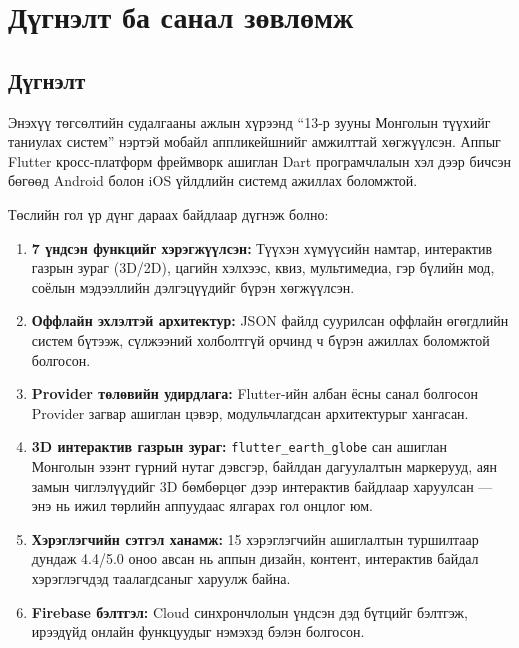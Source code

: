 \newpage
\pagestyle{plain}
\chapter{Дүгнэлт ба санал зөвлөмж}

\section{Дүгнэлт}

Энэхүү төгсөлтийн судалгааны ажлын хүрээнд ``13-р зууны Монголын түүхийг таниулах систем'' нэртэй мобайл аппликейшнийг амжилттай хөгжүүлсэн. Аппыг Flutter кросс-платформ фреймворк ашиглан Dart програмчлалын хэл дээр бичсэн бөгөөд Android болон iOS үйлдлийн системд ажиллах боломжтой.

Төслийн гол үр дүнг дараах байдлаар дүгнэж болно:

\begin{enumerate}
	\item \textbf{7 үндсэн функцийг хэрэгжүүлсэн:} Түүхэн хүмүүсийн намтар, интерактив газрын зураг (3D/2D), цагийн хэлхээс, квиз, мультимедиа, гэр бүлийн мод, соёлын мэдээллийн дэлгэцүүдийг бүрэн хөгжүүлсэн.
	
	\item \textbf{Оффлайн эхлэлтэй архитектур:} JSON файлд суурилсан оффлайн өгөгдлийн систем бүтээж, сүлжээний холболтгүй орчинд ч бүрэн ажиллах боломжтой болгосон.
	
	\item \textbf{Provider төлөвийн удирдлага:} Flutter-ийн албан ёсны санал болгосон Provider загвар ашиглан цэвэр, модульчлагдсан архитектурыг хангасан.
	
	\item \textbf{3D интерактив газрын зураг:} \texttt{flutter\_earth\_globe} сан ашиглан Монголын эзэнт гүрний нутаг дэвсгэр, байлдан дагуулалтын маркерууд, аян замын чиглэлүүдийг 3D бөмбөрцөг дээр интерактив байдлаар харуулсан — энэ нь ижил төрлийн аппуудаас ялгарах гол онцлог юм.
	
	\item \textbf{Хэрэглэгчийн сэтгэл ханамж:} 15 хэрэглэгчийн ашиглалтын туршилтаар дундаж 4.4/5.0 оноо авсан нь аппын дизайн, контент, интерактив байдал хэрэглэгчдэд таалагдсаныг харуулж байна.
	
	\item \textbf{Firebase бэлтгэл:} Cloud синхрончлолын үндсэн дэд бүтцийг бэлтгэж, ирээдүйд онлайн функцуудыг нэмэхэд бэлэн болгосон.
\end{enumerate}

